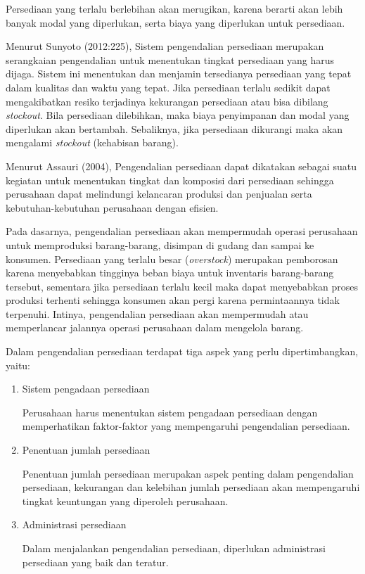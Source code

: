 Persediaan yang terlalu berlebihan akan merugikan, karena berarti akan lebih banyak modal yang diperlukan, serta biaya yang diperlukan untuk persediaan.

Menurut Sunyoto (2012:225), Sistem pengendalian persediaan merupakan serangkaian pengendalian untuk menentukan tingkat persediaan yang harus dijaga. Sistem ini menentukan dan menjamin tersedianya persediaan yang tepat dalam kualitas dan waktu yang tepat. Jika persediaan terlalu sedikit dapat mengakibatkan resiko terjadinya kekurangan persediaan atau bisa dibilang \textit{stockout}. Bila persediaan dilebihkan, maka biaya penyimpanan dan modal yang diperlukan akan bertambah. Sebaliknya, jika persediaan dikurangi maka akan mengalami \textit{stockout} (kehabisan barang).
 
Menurut Assauri (2004), Pengendalian persediaan dapat dikatakan sebagai suatu kegiatan untuk menentukan tingkat dan komposisi dari persediaan sehingga perusahaan dapat melindungi kelancaran produksi dan penjualan serta kebutuhan-kebutuhan perusahaan dengan efisien.

Pada dasarnya, pengendalian persediaan akan mempermudah operasi perusahaan untuk memproduksi barang-barang, disimpan di gudang dan sampai ke konsumen. Persediaan yang terlalu besar (\textit{overstock}) merupakan pemborosan karena menyebabkan tingginya beban biaya untuk inventaris barang-barang tersebut, sementara jika persediaan terlalu kecil maka dapat menyebabkan proses produksi terhenti sehingga konsumen akan pergi karena permintaannya tidak terpenuhi. Intinya, pengendalian persediaan akan mempermudah atau memperlancar jalannya operasi perusahaan dalam mengelola barang. 

Dalam pengendalian persediaan terdapat tiga aspek yang perlu dipertimbangkan, yaitu:

\begin{enumerate}
	\item Sistem pengadaan persediaan
	
	Perusahaan harus menentukan sistem pengadaan persediaan dengan memperhatikan faktor-faktor yang mempengaruhi pengendalian persediaan.

	\item Penentuan jumlah persediaan
	
	Penentuan jumlah persediaan merupakan aspek penting dalam pengendalian persediaan, kekurangan dan kelebihan jumlah persediaan akan mempengaruhi tingkat keuntungan yang diperoleh perusahaan.

	\item Administrasi persediaan
	
	Dalam menjalankan pengendalian persediaan, diperlukan administrasi persediaan yang baik dan teratur.
\end{enumerate}

